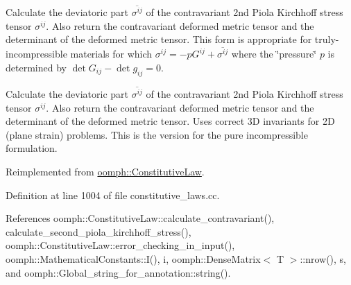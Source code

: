 Calculate the deviatoric part $ \overline{ \sigma^{ij}}$ of the contravariant 2nd Piola Kirchhoff stress tensor $ \sigma^{ij}$. Also return the contravariant deformed metric tensor and the determinant of the deformed metric tensor. This form is appropriate for truly-\/incompressible materials for which $ \sigma^{ij} = - p G^{ij} +\overline{ \sigma^{ij}} $ where the \char`\"{}pressure\char`\"{} $ p $ is determined by $ \det G_{ij} - \det g_{ij} = 0 $. 

Calculate the deviatoric part $ \overline{ \sigma^{ij}}$ of the contravariant 2nd Piola Kirchhoff stress tensor $ \sigma^{ij}$. Also return the contravariant deformed metric tensor and the determinant of the deformed metric tensor. Uses correct 3D invariants for 2D (plane strain) problems. This is the version for the pure incompressible formulation. 

Reimplemented from \hyperlink{classoomph_1_1ConstitutiveLaw_ac8178b1b7cd7e6a64942dba9e0997b30}{oomph\+::\+Constitutive\+Law}.



Definition at line 1004 of file constitutive\+\_\+laws.\+cc.



References oomph\+::\+Constitutive\+Law\+::calculate\+\_\+contravariant(), calculate\+\_\+second\+\_\+piola\+\_\+kirchhoff\+\_\+stress(), oomph\+::\+Constitutive\+Law\+::error\+\_\+checking\+\_\+in\+\_\+input(), oomph\+::\+Mathematical\+Constants\+::\+I(), i, oomph\+::\+Dense\+Matrix$<$ T $>$\+::nrow(), s, and oomph\+::\+Global\+\_\+string\+\_\+for\+\_\+annotation\+::string().

\mbox{\label{classoomph_1_1IsotropicStrainEnergyFunctionConstitutiveLaw_aa45d82d322fda480f88e78cddd557837}} 
